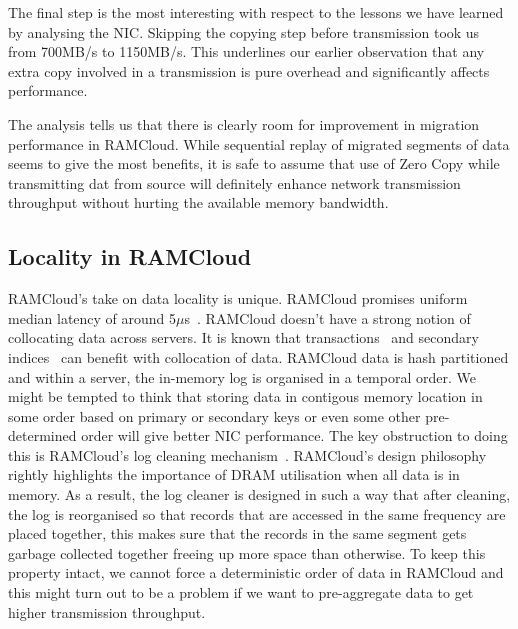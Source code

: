 The final step is the most interesting with respect to the lessons we have learned by analysing the NIC. Skipping the copying step before transmission took us from 700MB/s to 
1150MB/s. This underlines our earlier observation that any extra copy involved in a transmission is pure overhead and significantly affects performance. 

The analysis tells us that there is clearly room for improvement in migration performance in RAMCloud. While sequential replay of migrated segments of data seems to give the most benefits, 
it is safe to assume that use of Zero Copy while transmitting dat from source will definitely enhance network transmission throughput without hurting the available memory bandwidth.


\subsection{Locality in RAMCloud}
RAMCloud's take on data locality is unique. RAMCloud promises uniform median latency of around 5$\mu$s~\cite{ramcloud}. RAMCloud doesn't have a strong notion of collocating data across servers. 
It is known that transactions~\cite{ramcloudtx} and secondary indices~\cite{SLIK} can benefit with collocation of data. RAMCloud data is hash partitioned and within a server, the in-memory log is organised 
in a temporal order. We might be tempted to think that storing data in contigous memory location in some order based on primary or secondary keys or even some other pre-determined order will give better NIC performance. 
The key obstruction to doing this is RAMCloud's log cleaning mechanism~\cite{ramcloudfast}. RAMCloud's design philosophy rightly highlights the importance of DRAM utilisation when all data is in memory. 
As a result, the log cleaner is designed in such a way that after cleaning, the log is reorganised so that records that are accessed in the same frequency are placed together, this makes sure that the records in the same 
segment gets garbage collected together freeing up more space than otherwise. To keep this property intact, we cannot force a deterministic order of data in RAMCloud and this might turn out to be a problem if 
we want to pre-aggregate data to get higher transmission throughput.


